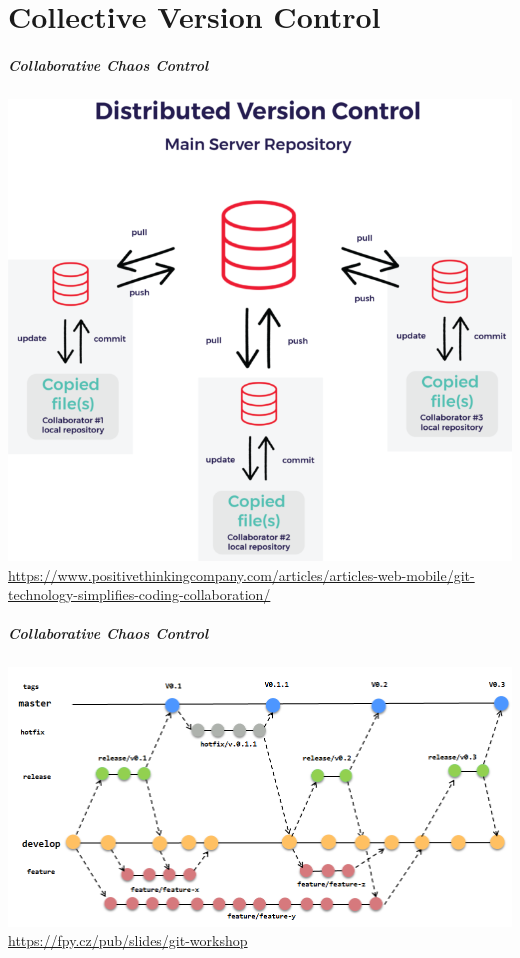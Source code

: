 \documentclass[
t, %
10pt, %
aspectratio=1610, %
ngerman,
english,
]{beamer}
\begin{document}
\part{Collective Version Control}
\makepart

\begin{frame}
    \frametitle{Collaborative Chaos Control}
    \centering
    \includegraphics[height=0.7\textheight]{graphics/DVC-distributed-version-control-768x704.png}\\
    \url{https://www.positivethinkingcompany.com/articles/articles-web-mobile/git-technology-simplifies-coding-collaboration/}
\end{frame}

\begin{frame}
    \frametitle{Collaborative Chaos Control}
    \centering
    \includegraphics[height=0.7\textheight]{graphics/gitflow.png}\\
    \url{https://fpy.cz/pub/slides/git-workshop}
\end{frame}
\end{document}
